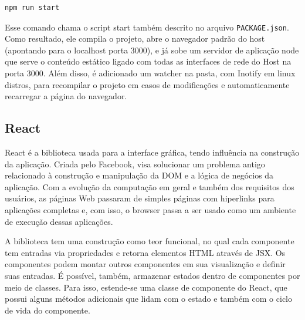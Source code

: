 \documentclass[rel_mlp]{iiufrgs}
\begin{document}
\begin{lstlisting}[language=JavaScript]
  npm run start
\end{lstlisting}

Esse comando chama o script start também descrito no arquivo \verb|PACKAGE.json|. Como resultado, ele compila o projeto, abre o navegador padrão do host (apontando para o localhost porta 3000), e já sobe um servidor de aplicação node que serve o conteúdo estático ligado com todas as interfaces de rede do Host na porta 3000. Além disso, é adicionado um watcher na pasta, com Inotify em linux distros, para recompilar o projeto em casos de modificações e automaticamente recarregar a página do navegador.

\subsection{React}
React é a biblioteca usada para a interface gráfica, tendo influência na construção da aplicação. Criada pelo Facebook, visa solucionar um problema antigo relacionado à construção e manipulação da DOM e a lógica de negócios da aplicação. Com a evolução da computação em geral e também dos requisitos dos usuários, as páginas Web passaram de simples páginas com hiperlinks para aplicações completas e, com isso, o browser passa a ser usado como um ambiente de execução dessas aplicações. \par
A biblioteca tem uma construção como teor funcional, no qual cada componente tem entradas via propriedades e retorna elementos HTML através de JSX. Os componentes podem montar outros componentes em sua visualização e definir suas entradas. É possível, também, armazenar estados dentro de componentes por meio de classes. Para isso, estende-se uma classe de componente do React, que possui alguns métodos adicionais que lidam com o estado e também com o ciclo de vida do componente.
\end{document}
